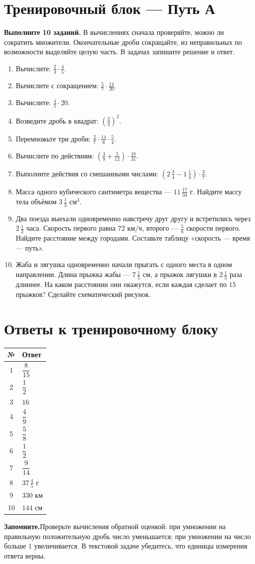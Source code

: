 \documentclass[a4paper,12pt]{article}
\newcommand{\sectionline}[1]{\section*{\color{darkaccent}#1}}
\newcommand{\keyidea}[1]{\par\noindent\textcolor{darkaccent}{\textbf{Запомните.}}\enspace #1\par}
\newcommand{\mix}[3]{#1\,\frac{#2}{#3}}
\begin{document}
\clearpage
\sectionline{Тренировочный блок --- Путь А}
\textbf{Выполните 10 заданий.} В вычислениях сначала проверяйте, можно ли
сократить множители. Окончательные дроби сокращайте, из неправильных
по возможности выделяйте целую часть. В задачах запишите решение и ответ.

\begin{enumerate}
\item Вычислите: $\displaystyle\frac23\cdot\frac45$.
\item Вычислите с сокращением: $\displaystyle\frac57\cdot\frac{14}{20}$.
\item Вычислите: $\displaystyle\frac45\cdot20$.
\item Возведите дробь в квадрат: $\displaystyle\left(\frac23\right)^2$.
\item Перемножьте три дроби: $\displaystyle\frac27\cdot\frac{14}{8}\cdot\frac54$.
\item Вычислите по действиям:
$\displaystyle\left(\frac49+\frac5{12}\right)\cdot\frac{18}{31}$.
\item Выполните действия со смешанными числами:
$\displaystyle\left(\mix{2}{3}{4}-\mix{1}{1}{4}\right)\cdot\frac37$.
\item Масса одного кубического сантиметра вещества ---
$\displaystyle\mix{11}{17}{50}$ г. Найдите массу тела объёмом
$\displaystyle\mix{3}{1}{3}$ см$^3$.
\item Два поезда выехали одновременно навстречу друг другу и встретились
через $\displaystyle\mix{2}{1}{2}$ часа. Скорость первого равна
$72$ км/ч, второго --- $\frac56$ скорости первого.
Найдите расстояние между городами. Составьте таблицу «скорость --- время --- путь».
\item Жаба и лягушка одновременно начали прыгать с одного места
в одном направлении. Длина прыжка жабы --- $\displaystyle\mix{7}{1}{5}$ см,
а прыжок лягушки в $\displaystyle\mix{2}{1}{3}$ раза длиннее.
На каком расстоянии они окажутся, если каждая сделает по $15$ прыжков?
Сделайте схематический рисунок.
\end{enumerate}

\clearpage
\sectionline{Ответы к тренировочному блоку}
\vspace{5mm}
\renewcommand{\arraystretch}{1.7}
\begin{center}
\begin{tabularx}{\linewidth}{@{}c>{\raggedright\arraybackslash}X@{}}
\toprule
\textbf{№} & \textbf{Ответ}\\
\midrule
1 & $\dfrac8{15}$\\
2 & $\dfrac12$\\
3 & $16$\\
4 & $\dfrac49$\\
5 & $\dfrac58$\\
6 & $\dfrac12$\\
7 & $\dfrac9{14}$\\
8 & $\mix{37}{4}{5}$ г\\
9 & $330$ км\\
10 & $144$ см\\
\bottomrule
\end{tabularx}
\end{center}

\vspace{8mm}
\keyidea{Проверьте вычисления обратной оценкой: при умножении на правильную
положительную дробь число уменьшается; при умножении на число больше $1$
увеличивается. В текстовой задаче убедитесь, что единицы измерения ответа верны.}
\end{document}
